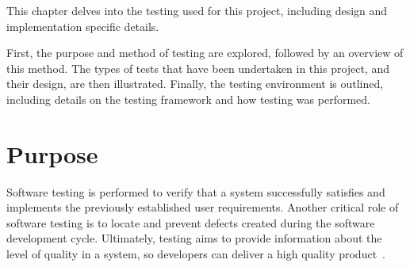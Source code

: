 This chapter delves into the testing used for this project, including design and implementation specific details.

First, the purpose and method of testing are explored, followed by an overview of this method. The types of tests that have been undertaken in this project, and their design, are then illustrated. Finally, the testing environment is outlined, including details on the testing framework and how testing was performed.

\section{Purpose} {
\label{sec:testing_purpose}

	Software testing is performed to verify that a system successfully satisfies and implements the previously established user requirements. Another critical role of software testing is to locate and prevent defects created during the software development cycle. Ultimately, testing aims to provide information about the level of quality in a system, so developers can deliver a high quality product~\parencite{istqb2015testing}.

}

